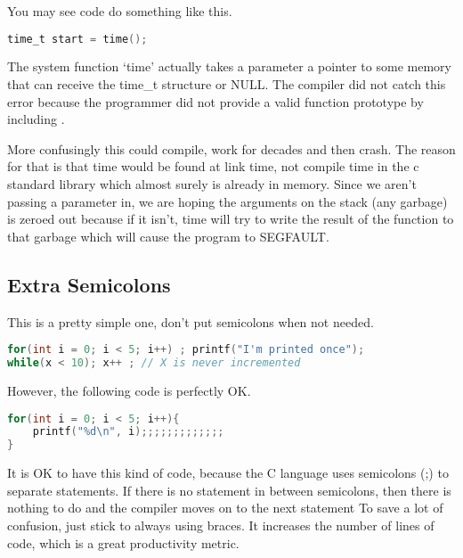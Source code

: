 You may see code do something like this.

\begin{lstlisting}[language=C]
time_t start = time();
\end{lstlisting}

The system function `time' actually takes a parameter a pointer to some memory that can receive the time\_t structure or NULL.
The compiler did not catch this error because the programmer did not provide a valid function prototype by including .

More confusingly this could compile, work for decades and then crash. The reason for that is that time would be found at link time, not compile time in the c standard library which almost surely is already in memory.
Since we aren't passing a parameter in, we are hoping the arguments on the stack (any garbage) is zeroed out because if it isn't, time will try to write the result of the function to that garbage which will cause the program to SEGFAULT.

\subsection{Extra Semicolons}

This is a pretty simple one, don't put semicolons when not needed.

\begin{lstlisting}[language=C]
for(int i = 0; i < 5; i++) ; printf("I'm printed once");
while(x < 10); x++ ; // X is never incremented
\end{lstlisting}

However, the following code is perfectly OK.

\begin{lstlisting}[language=C]
for(int i = 0; i < 5; i++){
    printf("%d\n", i);;;;;;;;;;;;;
}
\end{lstlisting}

It is OK to have this kind of code, because the C language uses
semicolons (;) to separate statements. If there is no statement in
between semicolons, then there is nothing to do and the compiler moves on to the next statement
To save a lot of confusion, just stick to always using braces.
It increases the number of lines of code, which is a great productivity metric.


